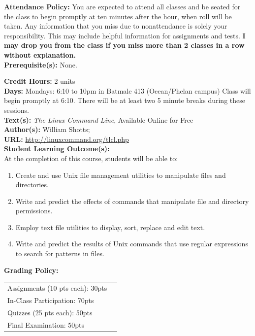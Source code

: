 \documentclass[11pt]{article}
\begin{document}
\textbf {Attendance Policy:} You are expected to attend all classes and be
seated for the class to begin promptly at ten minutes after the hour, when roll
will be taken. Any information
that you miss due to nonattendance is solely your responsibility. This may
include helpful information for assignments and tests. {\bf I may drop you from
the class if you miss more than 2 classes in a row without explanation.}\\

\textbf {Prerequisite(s):} None.

\textbf {Credit Hours:} 2 units\\
\textbf {Days:} Mondays: 6:10 to 10pm in Batmale 413 (Ocean/Phelan campus)
Class will begin promptly at 6:10. There will be at least two 5 minute breaks during these sessions.\\
\textbf {\large Text(s):} \emph{The Linux Command Line}, Available Online for Free\\
\textbf {Author(s):} William Shotts;\\
\textbf {URL:} \url{http://linuxcommand.org/tlcl.php} \\

\textbf {\large Student Learning Outcome(s):} \\
At the completion of this course, students will be able to:
\begin{enumerate} \itemsep-0.4em
  \item Create and use Unix file management utilities to manipulate files and directories.
  \item Write and predict the effects of commands that manipulate file and directory permissions.
  \item Employ text file utilities to display, sort, replace and edit text.
  \item Write and predict the results of Unix commands that use regular expressions to search for patterns in files.
\end{enumerate}

\textbf {\large Grading Policy:} \\
\hspace*{40mm}
\begin{tabular}{ l l }
  Assignments (10 pts each): 30pts \\
  In-Class Participation: 70pts \\
  Quizzes (25 pts each): 50pts \\
  Final Examination: 50pts \\
\end{tabular} \\\\
\end{document}
